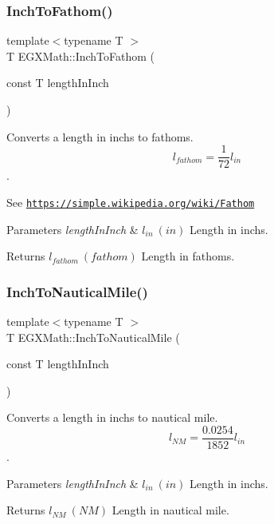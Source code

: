 \subsubsection{\texorpdfstring{Inch\+To\+Fathom()}{InchToFathom()}}
{\footnotesize\ttfamily template$<$typename T $>$ \\
T E\+G\+X\+Math\+::\+Inch\+To\+Fathom (\begin{DoxyParamCaption}\item[{const T}]{length\+In\+Inch }\end{DoxyParamCaption})}



Converts a length in inchs to fathoms. \[ l_{fathom}= \frac{1}{72} l_{in} \]. 

See \href{https://simple.wikipedia.org/wiki/Fathom}{\tt https\+://simple.\+wikipedia.\+org/wiki/\+Fathom} 
\begin{DoxyParams}{Parameters}
{\em length\+In\+Inch} & $ l_{in}\ (in)$ Length in inchs. \\
\hline
\end{DoxyParams}
\begin{DoxyReturn}{Returns}
$ l_{fathom}\ (fathom)$ Length in fathoms. 
\end{DoxyReturn}
\mbox{\label{group___e_g_x_math-_conversions-_length_conversions-_imperial-_inch-_nautical_ga40c14b43d58b6c2e3cebb1ff491bdcef}} 
\subsubsection{\texorpdfstring{Inch\+To\+Nautical\+Mile()}{InchToNauticalMile()}}
{\footnotesize\ttfamily template$<$typename T $>$ \\
T E\+G\+X\+Math\+::\+Inch\+To\+Nautical\+Mile (\begin{DoxyParamCaption}\item[{const T}]{length\+In\+Inch }\end{DoxyParamCaption})}



Converts a length in inchs to nautical mile. \[ l_{NM}= \frac{0.0254}{1852} l_{in} \]. 


\begin{DoxyParams}{Parameters}
{\em length\+In\+Inch} & $ l_{in}\ (in)$ Length in inchs. \\
\hline
\end{DoxyParams}
\begin{DoxyReturn}{Returns}
$ l_{NM}\ (NM)$ Length in nautical mile. 
\end{DoxyReturn}
